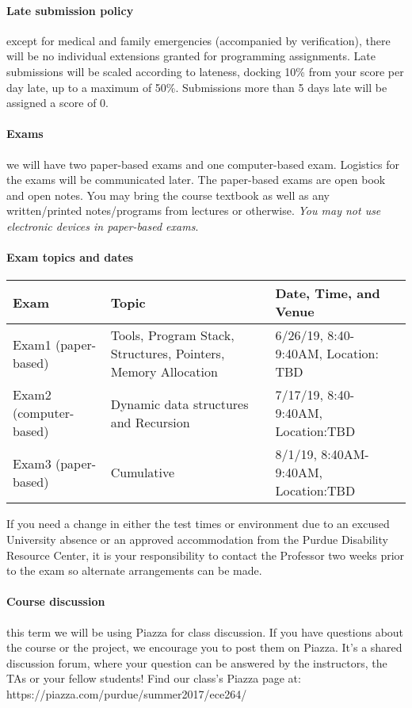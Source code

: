 \documentclass{article}
\begin{document}
\paragraph{Late submission policy} except for medical and family emergencies (accompanied by verification), there will be no individual extensions granted for programming assignments. Late submissions will be scaled according to lateness, docking 10\% from your score per day late, up to a maximum of 50\%. Submissions more than 5 days late will be assigned a score of 0.

\paragraph{Exams} we will have two paper-based exams and one computer-based exam. Logistics for the exams will be communicated later.
The paper-based exams are open book and open notes. You may bring the course textbook as well as any written/printed notes/programs from lectures or otherwise. {\em You may not use electronic devices in paper-based exams}.

\paragraph{Exam topics and dates}
\begin{table}[H]
\centering
\begin{tabulary}{\linewidth}{|l|p{70mm}|p{40mm}|}\hline
Exam & Topic & Date, Time, and Venue \\ \hline
Exam1 (paper-based) & Tools, Program Stack, Structures, Pointers, Memory Allocation &  6/26/19, 8:40-9:40AM, Location: TBD \\ \hline
Exam2 (computer-based) & Dynamic data structures and Recursion & 7/17/19, 8:40-9:40AM, Location:TBD \\ \hline
Exam3 (paper-based) & Cumulative & 8/1/19, 8:40AM-9:40AM, Location:TBD \\
\hline
\end{tabulary}
\end{table}

If you need a change in either the test times or environment due to an excused University absence or an approved accommodation from the Purdue Disability Resource Center, it is your responsibility to contact the Professor two weeks prior to the exam so alternate arrangements can be made. 

\paragraph{Course discussion} this term we will be using Piazza for class discussion. If you have questions about the course or the project, we encourage you to post them on Piazza. It's a shared discussion forum, where your question can be answered by the instructors, the TAs or your fellow students! Find our class's Piazza page at: https://piazza.com/purdue/summer2017/ece264/
\end{document}
